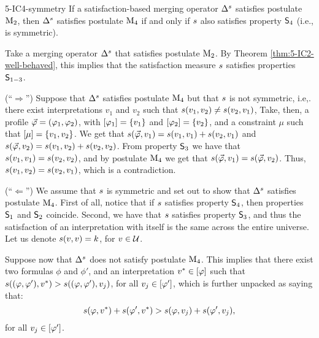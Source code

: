 \begin{thm}{}{5-IC4-symmetry}
	If a satisfaction-based merging operator $\me^\sat$ satisfies postulate $\ppm{2}$,
	then $\me^\sat$ satisfies postulate $\ppm{4}$ if and only if
	$\sat$ also satisfies property $\SM{4}$ (i.e., is symmetric).
\end{thm}
\begin{prf*}{}{}%
	Take a merging operator $\mer{\sat}{}$ that satisfies postulate $\ppm{2}$.
	By Theorem \ref{thm:5-IC2-well-behaved}, this implies that the satisfaction measure $\sat$
	satisfies properties $\SM{1-3}$.

	(``$\Rightarrow$'')
	Suppose that $\mer{\sat}{}$ satisfies postulate $\ppm{4}$
	but that $\sat$ is not symmetric, i.e,. there exist interpretations $v_1$ and $v_2$
	such that $\sat(v_1,v_2)\neq\sat(v_2,v_1)$,
	Take, then, a profile $\P=(\phi_1,\phi_2)$,
	with $\mods{\phi_1}=\set{v_1}$ and $\mods{\phi_2}=\set{v_2}$,
	and a constraint $\mu$ such that $\mods{\mu}=\set{v_1,v_2}$.
	We get that $\sat(\P,v_1)=\sat(v_1,v_1) + \sat(v_2,v_1)$
	and $\sat(\P,v_2)=\sat(v_1,v_2) + \sat(v_2,v_2)$.
	From property $\SM{3}$ we have that $\sat(v_1,v_1)=\sat(v_2,v_2)$,
	and by postulate $\ppm{4}$ we get that $\sat(\P,v_1)=\sat(\P,v_2)$.
	Thus, $\sat(v_1,v_2)=\sat(v_2,v_1)$, which is a contradiction.
	
	(``$\Leftarrow$'')
	We assume that $\sat$ is symmetric 
	and set out to show that $\mer{\sat}{}$ satisfies postulate $\ppm{4}$.
	First of all, notice that if $\sat$ satisfies property $\SM{4}$, then properties $\SM{1}$ and $\SM{2}$ 
	coincide.
	Second, we have that $\sat$ satisfies property $\SM{3}$, and thus the satisfaction of
	an interpretation with itself is the same across the entire universe.
	Let us denote $\sat(v,v)=k$, for $v\in\U$.
	
	Suppose now that $\mer{\sat}{}$ does not satisfy postulate $\ppm{4}$.
	This implies that
	there exist two formulas $\phi$ and $\phi'$,
	and an interpretation $v^\ast\in\mods{\phi}$ such that 
	$\sat((\phi,\phi'),v^\ast)>\sat((\phi,\phi'),v_j)$, for all $v_j\in\mods{\phi'}$, 
	which is further unpacked as saying that:
	\begin{equation}\label{eq:IC4-symmetry-1}
		\sat(\phi,v^\ast)+\sat(\phi',v^\ast)>\sat(\phi,v_j)+\sat(\phi',v_j),
	\end{equation}
	for all $v_j\in\mods{\phi'}$.
	

\end{prf*}
